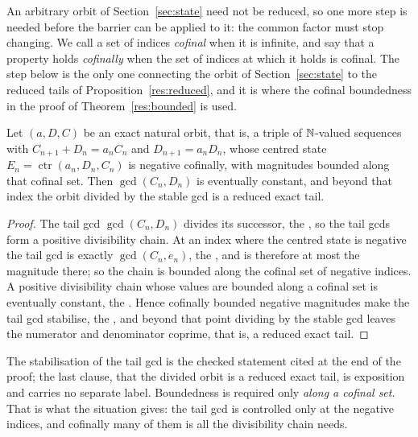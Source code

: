 \documentclass[11pt]{article}
\newcommand{\ctr}{\operatorname{ctr}}
\begin{document}
An arbitrary orbit of Section~\ref{sec:state} need not be reduced, so one more step is needed
before the barrier can be applied to it: the common factor must stop changing.
We call a set of indices \emph{cofinal} when it is infinite, and say that a
property holds \emph{cofinally} when the set of indices at which it holds is
cofinal.  The step below is the only one connecting the orbit of
Section~\ref{sec:state} to the reduced tails of
Proposition~\ref{res:reduced}, and it is where the cofinal boundedness in the
proof of Theorem~\ref{res:bounded} is used.

\begin{proposition}\label{res:gcdstab}
Let $(a,D,C)$ be an exact natural orbit, that is, a triple of $\mathbb{N}$-valued
sequences with $C_{n+1}+D_n=a_nC_n$ and $D_{n+1}=a_nD_n$, whose centred state
$E_n=\ctr(a_n,D_n,C_n)$ is negative cofinally, with magnitudes bounded along
that cofinal set.  Then
$\gcd(C_n,D_n)$ is eventually constant, and beyond that index the orbit divided
by the stable gcd is a reduced exact tail.
\end{proposition}

\begin{proof}
The tail gcd $\gcd(C_n,D_n)$ divides its successor, the
, so the tail gcds form a positive divisibility chain.  At an
index where the centred state is negative the tail gcd is exactly
$\gcd(C_n,e_n)$, the
, and is therefore at most the magnitude there; so the
chain is bounded along the cofinal set of negative indices.  A positive
divisibility chain whose values are bounded along a cofinal set is eventually
constant, the
.  Hence cofinally bounded negative magnitudes make the tail gcd
stabilise, the
, and beyond that point dividing by the stable gcd leaves the
numerator and denominator coprime, that is, a reduced exact tail.
\end{proof}

\noindent The stabilisation of the tail gcd is the checked statement cited at
the end of the proof; the last clause, that the divided orbit is a reduced
exact tail, is exposition and carries no separate label.  Boundedness is
required only \emph{along a cofinal set}.  That is what the situation gives:
the tail gcd is
controlled only at the negative indices, and cofinally many of them is all the
divisibility chain needs.
\end{document}
